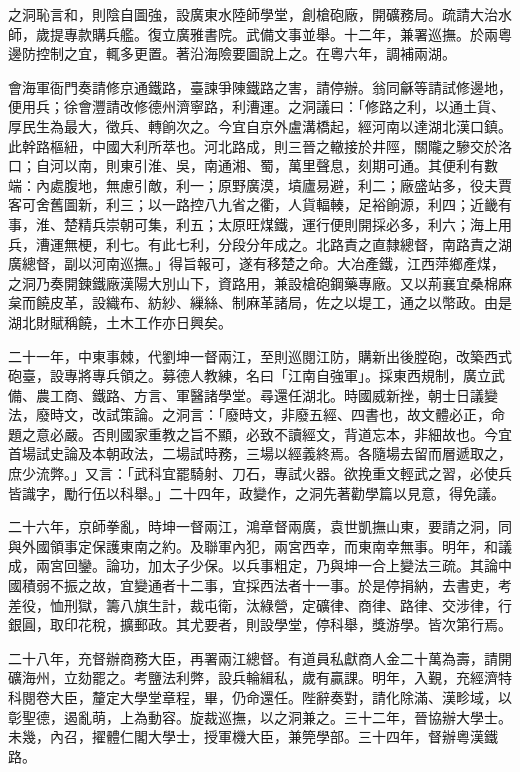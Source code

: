 \begin{pinyinscope}
之洞恥言和，則陰自圖強，設廣東水陸師學堂，創槍砲廠，開礦務局。疏請大治水師，歲提專款購兵艦。復立廣雅書院。武備文事並舉。十二年，兼署巡撫。於兩粵邊防控制之宜，輒多更置。著沿海險要圖說上之。在粵六年，調補兩湖。

會海軍衙門奏請修京通鐵路，臺諫爭陳鐵路之害，請停辦。翁同龢等請試修邊地，便用兵；徐會灃請改修德州濟寧路，利漕運。之洞議曰：「修路之利，以通土貨、厚民生為最大，徵兵、轉餉次之。今宜自京外盧溝橋起，經河南以達湖北漢口鎮。此幹路樞紐，中國大利所萃也。河北路成，則三晉之轍接於井陘，關隴之驂交於洛口；自河以南，則東引淮、吳，南通湘、蜀，萬里聲息，刻期可通。其便利有數端：內處腹地，無慮引敵，利一；原野廣漠，墳廬易避，利二；廠盛站多，役夫賈客可舍舊圖新，利三；以一路控八九省之衢，人貨輻輳，足裕餉源，利四；近畿有事，淮、楚精兵崇朝可集，利五；太原旺煤鐵，運行便則開採必多，利六；海上用兵，漕運無梗，利七。有此七利，分段分年成之。北路責之直隸總督，南路責之湖廣總督，副以河南巡撫。」得旨報可，遂有移楚之命。大冶產鐵，江西萍鄉產煤，之洞乃奏開鍊鐵廠漢陽大別山下，資路用，兼設槍砲鋼藥專廠。又以荊襄宜桑棉麻枲而饒皮革，設織布、紡紗、繅絲、制麻革諸局，佐之以堤工，通之以幣政。由是湖北財賦稱饒，土木工作亦日興矣。

二十一年，中東事棘，代劉坤一督兩江，至則巡閱江防，購新出後膛砲，改築西式砲臺，設專將專兵領之。募德人教練，名曰「江南自強軍」。採東西規制，廣立武備、農工商、鐵路、方言、軍醫諸學堂。尋還任湖北。時國威新挫，朝士日議變法，廢時文，改試策論。之洞言：「廢時文，非廢五經、四書也，故文體必正，命題之意必嚴。否則國家重教之旨不顯，必致不讀經文，背道忘本，非細故也。今宜首場試史論及本朝政法，二場試時務，三場以經義終焉。各隨場去留而層遞取之，庶少流弊。」又言：「武科宜罷騎射、刀石，專試火器。欲挽重文輕武之習，必使兵皆識字，勵行伍以科舉。」二十四年，政變作，之洞先著勸學篇以見意，得免議。

二十六年，京師拳亂，時坤一督兩江，鴻章督兩廣，袁世凱撫山東，要請之洞，同與外國領事定保護東南之約。及聯軍內犯，兩宮西幸，而東南幸無事。明年，和議成，兩宮回鑾。論功，加太子少保。以兵事粗定，乃與坤一合上變法三疏。其論中國積弱不振之故，宜變通者十二事，宜採西法者十一事。於是停捐納，去書吏，考差役，恤刑獄，籌八旗生計，裁屯衛，汰綠營，定礦律、商律、路律、交涉律，行銀圓，取印花稅，擴郵政。其尤要者，則設學堂，停科舉，獎游學。皆次第行焉。

二十八年，充督辦商務大臣，再署兩江總督。有道員私獻商人金二十萬為壽，請開礦海州，立劾罷之。考鹽法利弊，設兵輪緝私，歲有贏課。明年，入覲，充經濟特科閱卷大臣，釐定大學堂章程，畢，仍命還任。陛辭奏對，請化除滿、漢畛域，以彰聖德，遏亂萌，上為動容。旋裁巡撫，以之洞兼之。三十二年，晉協辦大學士。未幾，內召，擢體仁閣大學士，授軍機大臣，兼筦學部。三十四年，督辦粵漢鐵路。


\end{pinyinscope}
